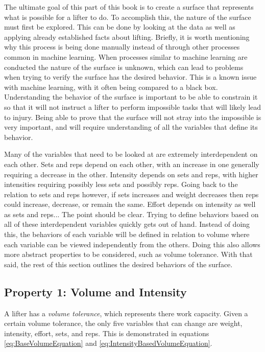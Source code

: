The ultimate goal of this part of this book is to create a surface that represents what is possible for a lifter to do. To accomplish this, the nature of the surface must first be explored. This can be done by looking at the data as well as applying already established facts about lifting. Briefly, it is worth mentioning why this process is being done manually instead of through other processes common in machine learning. When processes similar to machine learning are conducted the nature of the surface is unknown, which can lead to problems when trying to verify the surface has the desired behavior. This is a known issue with machine learning, with it often being compared to a black box. Understanding the behavior of the surface is important to be able to constrain it so that it will not instruct a lifter to perform impossible tasks that will likely lead to injury. Being able to prove that the surface will not stray into the impossible is very important, and will require understanding of all the variables that define its behavior.

Many of the variables that need to be looked at are extremely interdependent on each other. Sets and reps depend on each other, with an increase in one generally requiring a decrease in the other. Intensity depends on sets and reps, with higher intensities requiring possibly less sets and possibly reps. Going back to the relation to sets and reps however, if sets increases and weight decreases then reps could increase, decrease, or remain the same. Effort depends on intensity as well as sets and reps... The point should be clear. Trying to define behaviors based on all of these interdependent variables quickly gets out of hand. Instead of doing this, the behaviors of each variable will be defined in relation to volume where each variable can be viewed independently from the others. Doing this also allows more abstract properties to be considered, such as volume tolerance. With that said, the rest of this section outlines the desired behaviors of the surface.

\subsection{Property 1: Volume and Intensity}
\label{sec:PotentialSurfaceIntuitiveRelationshipsBetweenVariablesVolumeAndIntensity}

A lifter has a \textit{volume tolerance}, which represents there work capacity. Given a certain volume tolerance, the only five variables that can change are weight, intensity, effort, sets, and reps. This is demonstrated in equations \ref{eq:BaseVolumeEquation} and \ref{eq:IntensityBasedVolumeEquation}.

